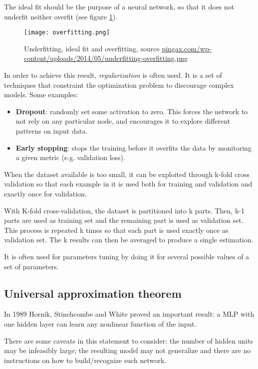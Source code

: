 The ideal fit should be the purpose of a neural network, so that it does not underfit neither overfit (see figure \ref{fig:overfitting}).

\begin{figure}
  \centering
  \texttt{[image: overfitting.png]}
  \caption{Underfitting, ideal fit and overfitting, source \url{pingax.com/wp-content/uploads/2014/05/underfitting-overfitting.png}}
  \label{fig:overfitting}
\end{figure}

In order to achieve this result, \textit{regularization} is often used. It is a set of techniques that constraint the optimization problem to discourage complex models. Some examples:

\begin{itemize}
 \item \textbf{Dropout}: randomly set some activation to zero. This forces the network to not rely on any particular node, and encourages it to explore different patterns on input data.
 \item \textbf{Early stopping}: stops the training before it overfits the data by monitoring a given metric (e.g. validation loss).
\end{itemize}

When the dataset available is too small, it can be exploited through k-fold cross validation so that each example in it is used both for training and validation and exactly once for validation.

With K-fold cross-validation, the dataset is partitioned into k parts. Then, k-1 parts are used as training set and the remaining part is used as validation set. This process is repeated k times so that each part is used exactly once as validation set.
The k results can then be averaged to produce a single estimation.

It is often used for parameters tuning by doing it for several possible values of a set of parameters.

\subsection{Universal approximation theorem}

In 1989 Hornik, Stinchcombe and White proved an important result: a MLP with one hidden layer can learn any nonlinear function of the input.

There are some caveats in this statement to consider: the number of hidden units may be infeasibly large; the resulting model may not generalize and there are no instructions on how to build/recognize such network.

